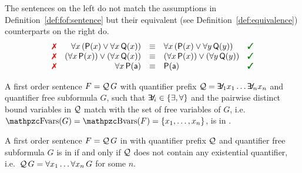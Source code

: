 \begin{example}The sentences on the left do not match
	the assumptions in Definition~\vref{def:fof:sentence}
	but their {equivalent (see Definition~\vref{def:equivalence})}
	counterparts on the right do.
	\[
	\begin{array}{rrcll}
		 \text{\color{colLo}{\xmark}}
		& \forall x\, ({\mP(x) \lor \forall x\, {\mQ(x)}})
		& {\equiv}
		& \forall x\, ({\mP(x) \lor \forall y\, {\mQ(y)}})
		& \text{\color{colHi}{\cmark}}
		\\ \text{\color{colLo}{\xmark}}
		& (\forall x\, {\mP(x)}) \lor (\forall x\, {\mQ(x)})
		& {\equiv}
		& (\forall x\, {\mP(x)}) \lor (\forall y\, {\mQ(y)})
		& \text{\color{colHi}{\cmark}}
		\\
		\text{\color{colLo}{\xmark}}
		&  \forall x\, {\mP(\ma)}
		& {\equiv}
		& \mP(\ma)
		& \text{\color{colHi}{\cmark}}
	\end{array}
	\]

\end{example}

\begin{definition}[\PNF]\label{def:prenex:normal:form}
	A first order sentence 
	\( F = \mathcal{Q}\,G \)
	with quantifier prefix 
	\( \mathcal{Q} = \quantify_1 x_1 \ldots \quantify_n x_n \)
	and quantifier free subformula \( G \),
	such that
	\( \quantify_i \in \{ \exists, \forall \} \) 
	and the pairwise distinct bound variables
	in \(\mathcal{Q}\)
	match with the set of free variables of \(G\), 
	i.e.~\( \fvar(G) = \bvar(F) = \{ x_1,\ldots,x_n \} \),
	is in .
\end{definition}

\begin{definition}[\SNF]\label{def:skolem:normal:form}
	A first order sentence \( F = \mathcal{Q}\,G \) in \PNF 
	with quantifier prefix \( \mathcal{Q} \) 
	and quantifier free subformula \( G \)
	is in 
	if and only if \( \mathcal{Q} \) does not contain any existential quantifier,
	i.e.~\( \mathcal{Q}\, G = \forall x_1 \ldots \forall x_n \, G \) for some \( n \).
\end{definition}


